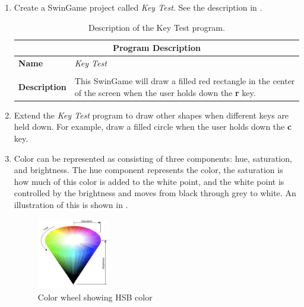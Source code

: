\begin{enumerate}
  \item Create a SwinGame project called \emph{Key Test}. See the description in .
  \begin{table}[htbp]
  \centering
  \begin{tabular}{l|p{10cm}}
    \hline
    \multicolumn{2}{c}{\textbf{Program Description}} \\
    \hline
    \textbf{Name} & \emph{Key Test} \\
    \\
    \textbf{Description} & This SwinGame will draw a filled red rectangle in the center of the screen when the user holds down the \textbf{r} key.\\
    \hline
  \end{tabular}
  \caption{Description of the Key Test program.}
  \label{tbl:key_test}
  \end{table}

  \item Extend the \emph{Key Test} program to draw other shapes when different keys are held down. For example, draw a filled circle when the user holds down the \textbf{c} key.

  
  \clearpage
  \item Color can be represented as consisting of three components: hue, saturation, and brightness. The hue component represents the color, the saturation is how much of this color is added to the white point, and the white point is controlled by the brightness and moves from black through grey to white. An illustration of this is shown in .

\begin{figure}[htbp]
   \centering
   \includegraphics[width=0.3\textwidth]{./topics/control-flow/exercises/Color.png} 
   \caption{Color wheel showing HSB color}
   \label{fig:color_wheel}
\end{figure}


\end{enumerate}
